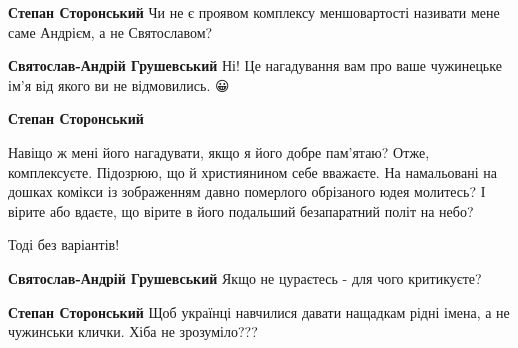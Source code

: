 \begin{itemize}
\begin{itemize}
 
\textbf{Степан Сторонський} Чи не є проявом комплексу меншовартості називати мене саме Андрієм, а не Святославом?

 
\textbf{Святослав-Андрій Грушевський} Ні! Це нагадування вам про ваше чужинецьке ім'я від якого ви не відмовились. 😀

 
\textbf{Степан Сторонський} 

Навіщо ж мені його нагадувати, якщо я його добре
пам'ятаю? Отже, комплексуєте. Підозрюю, що й християнином себе вважаєте. На
намальовані на дошках комікси із зображенням давно померлого обрізаного юдея
молитесь? І вірите або вдаєте, що вірите в його подальший безапаратний політ на
небо?

Тоді без варіантів!


 
\textbf{Святослав-Андрій Грушевський} Якщо не цураєтесь - для чого критикуєте?

 
\textbf{Степан Сторонський} Щоб українці навчилися давати нащадкам рідні імена, а не чужинськи клички. Хіба не зрозуміло???


\end{itemize}
\end{itemize}
